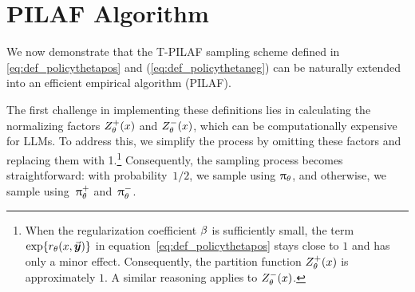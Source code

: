 \section{PILAF Algorithm}	\label{sec:sampling_exp}


We now demonstrate that the T-PILAF sampling scheme defined in \cref{eq:def_policythetapos} and (\ref{eq:def_policythetaneg}) can be naturally extended into an efficient empirical algorithm (PILAF).

The first challenge in implementing these definitions lies in calculating the normalizing factors $Z_{\theta}^+(x)$ and $Z_{\theta}^-(x)$, which can be computationally expensive for LLMs. To address this, we simplify the process by omitting these factors and replacing them with 1.\footnote{When the regularization coefficient $\beta$ is sufficiently small, the term $\exp\{r_{\theta}(x, \vec{\boldsymbol{y}}\!\,)\}$ in equation~\eqref{eq:def_policythetapos} stays close to $1$ and has only a minor effect. Consequently, the partition function $Z_{\theta}^+(x)$ is approximately $1$. A similar reasoning applies to $Z_{\theta}^-(x)$.
\vspace{-1.4em}
}
Consequently, the sampling process becomes straightforward: with probability~\(1/2\), we sample using \(\uppi_{\theta}\), and otherwise, we sample using~\(\uppi_{\theta}^+\) and~\(\uppi_{\theta}^-\).


